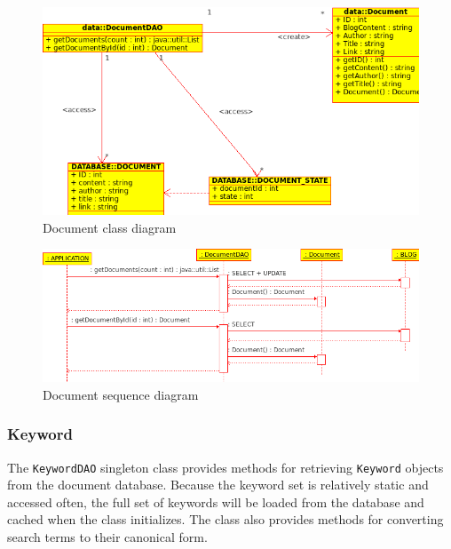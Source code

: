 \documentclass[10pt]{report}
\begin{document}
\begin{figure}
  \begin{center}
        \includegraphics[width=\textwidth,height=!]{documentclassdiagram}
  \end{center}
  \caption{Document class diagram}
  \label{fig:documentclassdiagram}
\end{figure} 

\begin{figure}
  \begin{center}
        \includegraphics[width=\textwidth,height=!]{documentsequencediagram}
  \end{center}
  \caption{Document sequence diagram}
  \label{fig:documentsequencediagram}
\end{figure} 


\subsubsection{Keyword}
The \texttt{KeywordDAO} singleton class provides methods for
retrieving \texttt{Keyword} objects from the document
database. Because the keyword set is relatively static and accessed
often, the full set of keywords will be loaded from the database and
cached when the class initializes. The class also provides methods for
converting search terms to their canonical form.
\end{document}
